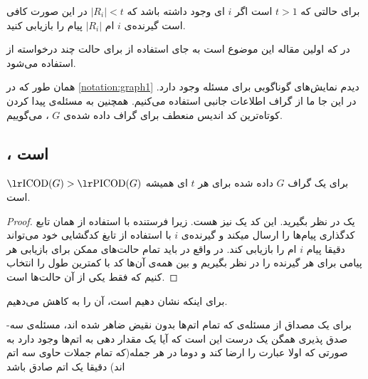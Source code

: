 \begin{note}
	برای حالتی که
	$t > 1$
	است اگر
	$i$
	ای وجود داشته باشد که
	$|R_i| < t$
	در این صورت کافی است گیرنده‌ی 
	$i$
	ام
	$|R_i|$
	پیام را بازیابی کنید.
	\cite{pliablefirstpaper}
\end{note}

\begin{note}
	در 
	\cite{pliablefirstpaper}
	که اولین مقاله این موضوع است به جای استفاده از
	\picodt
	برای حالت چند درخواسته از
	استفاده می‌شود.
\end{note}
\begin{notation}
	همان طور که در
	\autoref{notation:graph1}
	دیدم نمایش‌های گوناگوبی برای مسئله وجود دارد. در این جا ما از گراف اطلاعات جانبی استفاده می‌کنیم. همچنین به مسئله‌ی پیدا کردن کوتاه‌ترین کد اندیس منعطف برای گراف داده شده‌ی 
	$G$
	،
	\picodg
	می‌گوییم.
\end{notation}

\subsection{
\picod
،
\nphard
 است
}

\begin{lemma}
برای یک گراف
$G$
داده شده برای هر
$t$
ای همیشه
 $\text{\icodg} > \text{\picodg}$
 است.
 \cite{pliablefirstpaper}
\end{lemma}
\begin{proof}
	یک 
	\icod
	در نظر بگیرید. این کد یک
	\picod
	نیز هست. زیرا فرستنده با استفاده از همان تابع کدگذاری پیام‌ها را ارسال میکند و گیرنده‌ی
	$i$
	با استفاده از تابغ کدگشایی خود می‌تواند دقیقا	 پیام
	$i$
	ام را بازیابی کند. در واقع در
	\picod
	باید تمام حالت‌های ممکن برای بازیابی هر پیامی برای هر گیرنده را در نظر بگیریم و بین همه‌ی آن‌ها کد با کمترین طول را انتخاب کنیم که 
	\icod
	فقط یکی از آن حالت‌ها است.
\end{proof}

برای اینکه نشان دهیم
\picod 
\nphard
است، آن را به
کاهش می‌دهیم.

\begin{definition}
	برای یک مصداق از مسئله‌ی 
که تمام اتم‌ها بدون نقیض ضاهر شده اند، مسئله‌ی سه-صدق پذیری همگن یک درست این است که آیا یک مقدار دهی به اتم‌ها وجود دارد به صورتی که اولا عبارت را ارضا کند و دوما در هر جمله(که تمام جملات حاوی سه اتم اند) دقیقا یک اتم صادق باشد
\end{definition}

